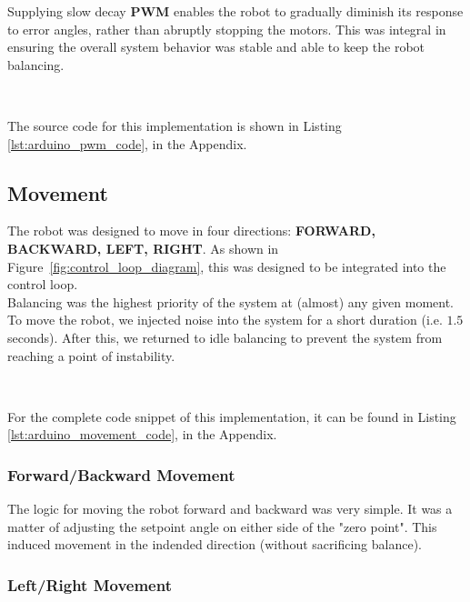 \documentclass{article}
\begin{document}
\begin{minipage}{\linewidth}
    Supplying slow decay \textbf{PWM} enables the robot to gradually diminish its response to error angles, rather than abruptly stopping the motors.
    This was integral in ensuring the overall system behavior was stable and able to keep the robot balancing.

    \

    The source code for this implementation is shown in Listing \ref{lst:arduino_pwm_code}, in the Appendix.
\end{minipage}

\subsection{Movement}
\label{sec:movement}

\begin{minipage}{\linewidth}
    The robot was designed to move in four directions: \textbf{FORWARD, BACKWARD, LEFT, RIGHT}.
    As shown in Figure~\ref{fig:control_loop_diagram}, this was designed to be integrated into the control loop.  \\

    Balancing was the highest priority of the system at (almost) any given moment. To move the robot, we injected noise into the system for a short duration
    (i.e. $1.5$ seconds). After this, we returned to idle balancing to prevent the system from reaching a point of instability.

    \

    For the complete code snippet of this implementation, it can be found in Listing \ref{lst:arduino_movement_code}, in the Appendix.
\end{minipage}

\subsubsection{Forward/Backward Movement}

\begin{minipage}{\linewidth}
    The logic for moving the robot forward and backward was very simple. It was a matter of adjusting the setpoint angle on either side of the "zero point".
    This induced movement in the indended direction (without sacrificing balance). \\
\end{minipage}

\subsubsection{Left/Right Movement}
\end{document}
